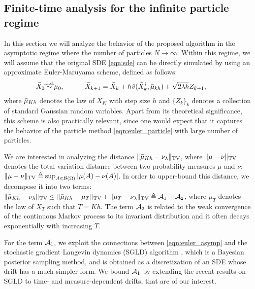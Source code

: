 
\subsection{Finite-time analysis for the infinite particle regime}



In this section we will analyze the behavior of the proposed algorithm in the asymptotic regime where the number of particles $N \rightarrow \infty$. Within this regime, we will assume that the original SDE \eqref{eqn:sde} can be directly simulated by using an approximate Euler-Maruyama scheme, defined as follows:
\begin{align}
\bar{X}_0 \simiid \mu_0, \quad \qquad \bar{X}_{k+1} = \bar{X}_k + h \hspace{0.5pt} \hat{v}(\bar{X}^i_k, \bar{\mu}_{kh} ) + \sqrt{2 \lambda h} Z_{k+1}, \qquad \label{eqn:euler_asymp}
\end{align}
where $\bar{\mu}_{Kh}$ denotes the law of $\bar{X}_K$ with step size $h$ and $\{Z_k\}_{k}$ denotes a collection of standard Gaussian random variables. Apart from its theoretical significance, this scheme is also practically relevant, since one would expect that it captures the behavior of the particle method \eqref{eqn:euler_particle} with large number of particles. 

We are interested in analyzing the distance $\| \bar{\mu}_{Kh} - \nu_\lambda \|_{\textnormal{TV}}$, where $\|\mu-\nu\|_{\textnormal{TV}}$ denotes the total variation distance between two probability measures $\mu$ and $\nu$: $\|\mu-\nu\|_{\textnormal{TV}}\triangleq \sup_{A \in {\cal B}(\Omega)} |\mu(A) -\nu(A) |$. 
%
In order to upper-bound this distance, we decompose it into two terms: $\| \bar{\mu}_{Kh} - \nu_\lambda \|_{\textnormal{TV}} \leq \| \bar{\mu}_{Kh} - \mu_T \|_{\textnormal{TV}} + \| \mu_{T} - \nu_\lambda \|_{\textnormal{TV}} \triangleq {\cal A}_1 + {\cal A}_2$, where $\mu_T$ denotes the law of $X_T$ such that $T=Kh$. The term ${\cal A}_2$ is related to the weak convergence of the continuous Markov process to its invariant distribution and it often decays exponentially with increasing $T$. 

For the term ${\cal A}_1$, we exploit the connections between \eqref{eqn:euler_asymp} and the stochastic gradient Langevin dynamics (SGLD) algorithm \cite{WelTeh2011a}, which is a Bayesian posterior sampling method, and is obtained as a discretization of an SDE whose drift has a much simpler form. We bound ${\cal A}_1$ by extending the recent results on SGLD \cite{raginsky17a} to time- and measure-dependent drifts, that are of our interest.

